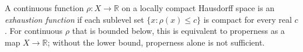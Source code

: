 
A continuous function $\rho:X\to\mathbb R$ on a locally compact Hausdorff space is an \emph{exhaustion function} if each sublevel set $\{x:\rho(x)\le c\}$ is compact for every real $c$. For continuous $\rho$ that is bounded below, this is equivalent to properness as a map $X\to\mathbb R$; without the lower bound, properness alone is not sufficient.
